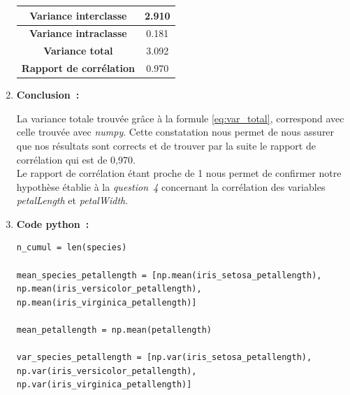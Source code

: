 \begin{enumerate}
        \begin{center}
            \begin{tabular}{| c | c |}
                \hline
                \textbf{Variance interclasse} & 2.910\\\hline
                \textbf{Variance intraclasse} & 0.181\\ \hline
                \textbf{Variance total} & 3.092\\ \hline
                \textbf{Rapport de corrélation} & 0.970\\ \hline


            \end{tabular}
        \end{center}

        \vspace{.5cm}

    \item \textbf{Conclusion~:}
    
        \vspace{.2cm}
        
        La variance totale trouvée grâce à la formule \ref*{eq:var_total}, correspond avec celle trouvée avec \textit{numpy}. Cette constatation nous permet de nous assurer que nos résultats sont corrects et de trouver par la suite le rapport 
        de corrélation qui est de 0,970. \\
        Le rapport de corrélation étant proche de 1 nous permet de confirmer notre hypothèse établie à la \textit{question~4} concernant la corrélation des variables \textit{petalLength} et \textit{petalWidth}.

        \vspace{.5cm}

    \item \textbf{Code python~:}
    
    \vspace{.2cm}

        \begin{lstlisting}[style=myPython, caption=Code Python pour calculer le coefficient de corrélation, frame=lines]
n_cumul = len(species)

mean_species_petallength = [np.mean(iris_setosa_petallength), np.mean(iris_versicolor_petallength), np.mean(iris_virginica_petallength)]

mean_petallength = np.mean(petallength)

var_species_petallength = [np.var(iris_setosa_petallength), np.var(iris_versicolor_petallength), np.var(iris_virginica_petallength)]


\end{lstlisting}
\end{enumerate}
